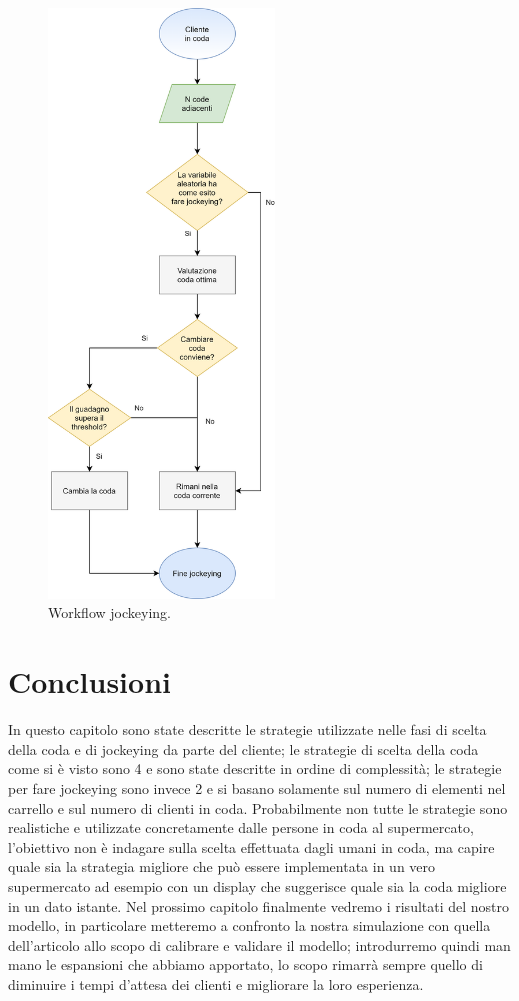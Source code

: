 \begin{figure}[htp!]
	\centering
	\includegraphics[width=6cm]{"images/jockeying-flowchart.png"}
	\caption{Workflow jockeying.}
	\label{fig:jockeying-flowchart}
\end{figure}


\section{Conclusioni}
In questo capitolo sono state descritte le strategie utilizzate nelle fasi di scelta della coda e di jockeying da parte del cliente; le strategie di scelta della coda come si è visto sono 4 e sono state descritte in ordine di complessità; le strategie per fare jockeying sono invece 2 e si basano solamente sul numero di elementi nel carrello e sul numero di clienti in coda. Probabilmente non tutte le strategie sono realistiche e utilizzate concretamente dalle persone in coda al supermercato, l'obiettivo non è indagare sulla scelta effettuata dagli umani in coda, ma capire quale sia la strategia migliore che può essere implementata in un vero supermercato ad esempio con un display che suggerisce quale sia la coda migliore in un dato istante. Nel prossimo capitolo finalmente vedremo i risultati del nostro modello, in particolare metteremo a confronto la nostra simulazione con quella dell'articolo \cite{article1} allo scopo di calibrare e validare il modello; introdurremo quindi man mano le espansioni che abbiamo apportato, lo scopo rimarrà sempre quello di diminuire i tempi d'attesa dei clienti e migliorare la loro esperienza.
